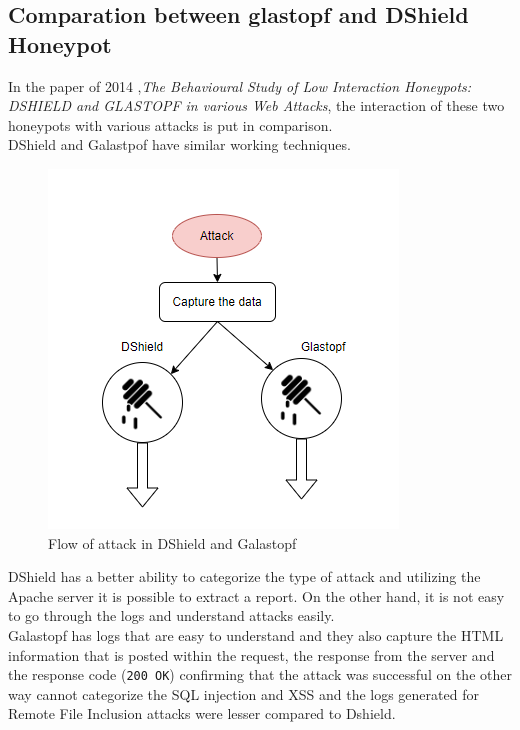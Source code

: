 \subsection{Comparation between glastopf and DShield Honeypot}
In the paper of 2014 ,\textit{The Behavioural Study of Low Interaction Honeypots: DSHIELD and GLASTOPF in various Web Attacks}\cite{dshieldandGlastopf}, the interaction of these two honeypots with various attacks is put in comparison.\\
DShield and Galastpof have similar working techniques.
\begin{figure}[h!]
\centering
\includegraphics{images/workingtecniques.png}
\caption{Flow of attack in DShield and Galastopf}
\label{fig:irradiances}
\end{figure}
\FloatBarrier
DShield has a better ability to categorize the type of attack and utilizing the Apache server it is possible to extract a report. On the other hand, it is not easy to go through the logs and understand attacks easily.\\
Galastopf has logs that are easy to understand and they also capture the HTML information that is posted within the request, the response from the server and the response code (\texttt{200 OK}) confirming that the attack was successful on the other way cannot categorize the SQL injection and XSS and the logs generated for Remote File Inclusion attacks were lesser compared to Dshield.\\

